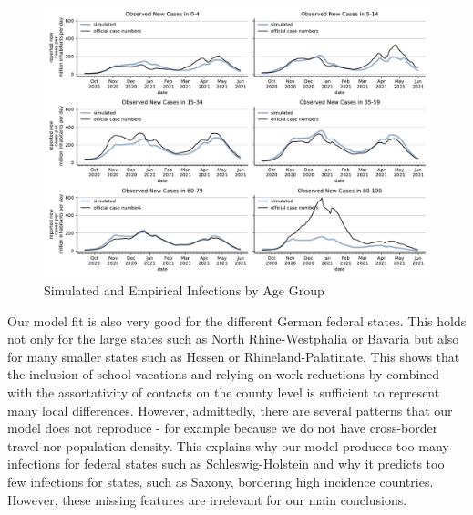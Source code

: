 \begin{figure}[ht]  %
  \centering
  \includegraphics[width=\textwidth]{figures/results/figures/incidences_by_group/age_group_rki/full_combined_baseline_new_known_case}
  \caption{Simulated and Empirical Infections by Age Group}
  \label{fig:age_group_fit}
\end{figure}


\FloatBarrier

Our model fit is also very good for the different German federal states. This holds not
only for the large states such as North Rhine-Westphalia or Bavaria but also for many
smaller states such as Hessen or Rhineland-Palatinate. This shows that the inclusion of
school vacations and relying on work reductions by \cite{Google2021} combined with the
assortativity of contacts on the county level is sufficient to represent many local
differences.  %
However, admittedly, there are several patterns that our model does not reproduce - for
example because we do not have cross-border travel nor population density. This explains
why our model produces too many infections for federal states such as Schleswig-Holstein
and why it predicts too few infections for states, such as Saxony, bordering high
incidence countries.
However, these missing features are irrelevant for our main conclusions.


